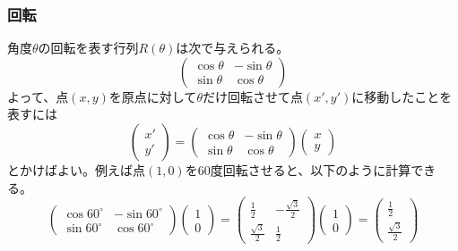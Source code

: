 \documentclass[10pt]{jsarticle}
\theoremstyle{definition}%
\newcommand{\kakko}[1]{\left(#1 \right)} %
\numberwithin{equation}{section}%
\begin{document}
\subsubsection{回転}
角度$\theta$の回転を表す行列$R(\theta)$は次で与えられる。
\begin{equation}
  \kakko{\begin{matrix}
    \cos \theta & -\sin \theta\\
    \sin \theta & \cos \theta
  \end{matrix}}
\end{equation}
よって、点$(x,y)$を原点に対して$\theta$だけ回転させて点$(x',y')$に移動したことを表すには
\begin{equation}
    \kakko{\begin{matrix}
      x'\\
      y'
    \end{matrix}}=
    \kakko{\begin{matrix}
      \cos \theta & -\sin \theta\\
      \sin \theta & \cos \theta
    \end{matrix}}\kakko{\begin{matrix}
      x\\
      y
    \end{matrix}}
\end{equation}
とかけばよい。例えば点$(1,0)$を$60$度回転させると、以下のように計算できる。
\begin{equation}
  \kakko{\begin{matrix}
    \cos 60^{\circ} & -\sin 60^{\circ}\\
    \sin 60^{\circ} & \cos 60^{\circ}
  \end{matrix}}\kakko{\begin{matrix}
    1\\
    0
  \end{matrix}}= \kakko{\begin{matrix}
    \frac{1}{2} & -\frac{\sqrt{3}}{2}\\
    \frac{\sqrt{3}}{2} & \frac{1}{2}
  \end{matrix}}\kakko{\begin{matrix}
    1\\
    0
  \end{matrix}}=\kakko{\begin{matrix}
    \frac{1}{2}\\
    \frac{\sqrt{3}}{2}
  \end{matrix}}
\end{equation}
\end{document}
